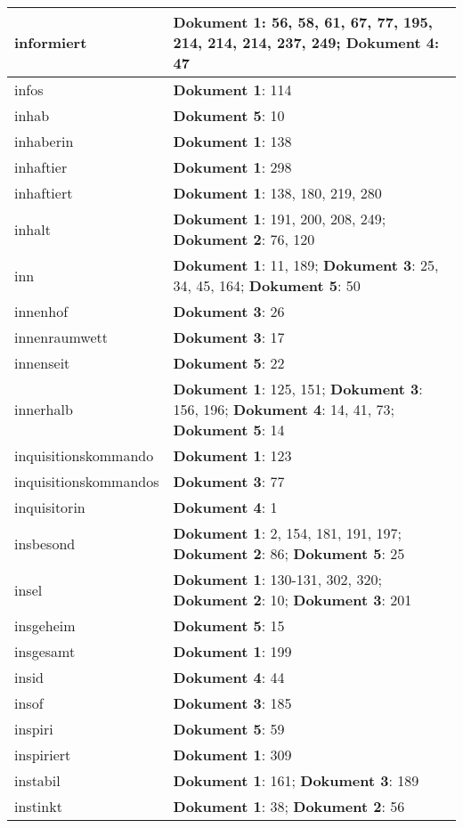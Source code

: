 \documentclass[a5paper]{article}
\begin{document}
\begin{longtable}[l]{|l|p{3in}|}
\hline
informiert & \textbf{Dokument 1}: 56, 58, 61, 67, 77, 195, 214, 214, 214, 237, 249; \textbf{Dokument 4}: 47 \\
\hline
infos & \textbf{Dokument 1}: 114 \\
\hline
inhab & \textbf{Dokument 5}: 10 \\
\hline
inhaberin & \textbf{Dokument 1}: 138 \\
\hline
inhaftier & \textbf{Dokument 1}: 298 \\
\hline
inhaftiert & \textbf{Dokument 1}: 138, 180, 219, 280 \\
\hline
inhalt & \textbf{Dokument 1}: 191, 200, 208, 249; \textbf{Dokument 2}: 76, 120 \\
\hline
inn & \textbf{Dokument 1}: 11, 189; \textbf{Dokument 3}: 25, 34, 45, 164; \textbf{Dokument 5}: 50 \\
\hline
innenhof & \textbf{Dokument 3}: 26 \\
\hline
innenraumwett & \textbf{Dokument 3}: 17 \\
\hline
innenseit & \textbf{Dokument 5}: 22 \\
\hline
innerhalb & \textbf{Dokument 1}: 125, 151; \textbf{Dokument 3}: 156, 196; \textbf{Dokument 4}: 14, 41, 73; \textbf{Dokument 5}: 14 \\
\hline
inquisitionskommando & \textbf{Dokument 1}: 123 \\
\hline
inquisitionskommandos & \textbf{Dokument 3}: 77 \\
\hline
inquisitorin & \textbf{Dokument 4}: 1 \\
\hline
insbesond & \textbf{Dokument 1}: 2, 154, 181, 191, 197; \textbf{Dokument 2}: 86; \textbf{Dokument 5}: 25 \\
\hline
insel & \textbf{Dokument 1}: 130-131, 302, 320; \textbf{Dokument 2}: 10; \textbf{Dokument 3}: 201 \\
\hline
insgeheim & \textbf{Dokument 5}: 15 \\
\hline
insgesamt & \textbf{Dokument 1}: 199 \\
\hline
insid & \textbf{Dokument 4}: 44 \\
\hline
insof & \textbf{Dokument 3}: 185 \\
\hline
inspiri & \textbf{Dokument 5}: 59 \\
\hline
inspiriert & \textbf{Dokument 1}: 309 \\
\hline
instabil & \textbf{Dokument 1}: 161; \textbf{Dokument 3}: 189 \\
\hline
instinkt & \textbf{Dokument 1}: 38; \textbf{Dokument 2}: 56 \\

\end{longtable}
\end{document}
